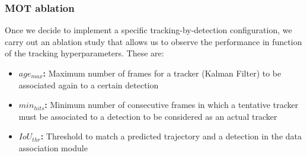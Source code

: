
\subsubsection{MOT ablation}
\label{subsubsec:4_mot_ablation}

Once we decide to implement a specific tracking-by-detection configuration, we carry out an ablation study that allows us to observe the performance in function of the tracking hyperparameters. These are:

\begin{itemize}
	\item \textbf{$age_{max}$: } Maximum number of frames for a tracker (Kalman Filter) to be associated again to a certain detection
	\item \textbf{$min_{hits}$: } Minimum number of consecutive frames in which a tentative tracker must be associated to a detection to be considered as an actual tracker
	\item \textbf{$IoU_{thr}$: } Threshold to match a predicted trajectory and a detection in the data association module
\end{itemize}

